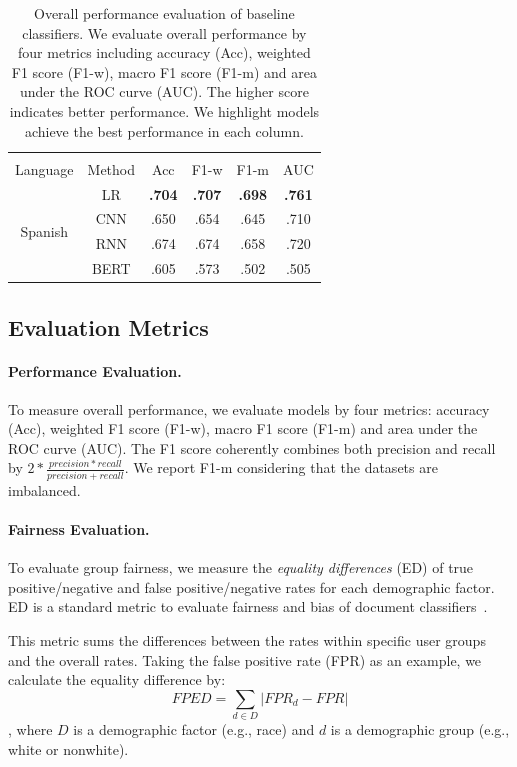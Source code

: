 \begin{table}[htp]
\begin{tabular}{cc|cccc}
\multicolumn{6}{c}{} \\
Language & Method & Acc & F1-w & F1-m & AUC \\\hline
\multirow{4}{*}{Spanish} & LR & \textbf{.704} & \textbf{.707} & \textbf{.698} & \textbf{.761} \\
 & CNN & .650 & .654 & .645 & .710\\
 & RNN & .674 & .674 & .658 & .720 \\
 & BERT & .605 & .573 & .502 & .505
\end{tabular}
\caption{Overall performance evaluation of baseline classifiers. We evaluate overall performance by four metrics including accuracy (Acc), weighted F1 score (F1-w), macro F1 score (F1-m) and area under the ROC curve (AUC). The higher score indicates better performance. We highlight models achieve the best performance in each column.}
\label{chap5:tab:perform}
\end{table}


\subsection{Evaluation Metrics}

\paragraph{Performance Evaluation.}
To measure overall performance, we evaluate models by four metrics: accuracy (Acc), weighted F1 score (F1-w), macro F1 score (F1-m) and area under the ROC curve (AUC). %
The F1 score coherently combines both precision and recall by $2*\frac{precision*recall}{precision+recall}$.
We report F1-m considering that the datasets are imbalanced.

\paragraph{Fairness Evaluation.}
To evaluate {group fairness}, we measure the \textit{equality differences} (ED) of true positive/negative and false positive/negative rates for each demographic factor. 
ED is a standard metric to evaluate fairness and bias of document classifiers~\cite{dixon2018measuring,park2018reducing,garg2019counterfactual}.

This metric sums the differences between the rates within specific user groups and the overall rates.
Taking the false positive rate (FPR) as an example, we calculate the equality difference by:
$$FPED = \sum_{d \in D}|FPR_d - FPR|$$
, where $D$ is a demographic factor (e.g., race) and $d$ is a demographic group (e.g., white or nonwhite).



